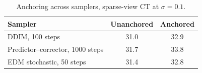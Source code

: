 \begin{table}[t]
  \centering
  \caption{Anchoring across samplers, sparse-view CT at $\sigma = 0.1$.}
  \label{tab:sampler}
  \begin{tabular}{lcc}
    \toprule
    Sampler & Unanchored & Anchored \\
    \midrule
    DDIM, 100 steps & 31.0 & 32.9 \\
    Predictor--corrector, 1000 steps & 31.7 & 33.8 \\
    EDM stochastic, 50 steps & 31.4 & 32.8 \\
    \bottomrule
  \end{tabular}
\end{table}
